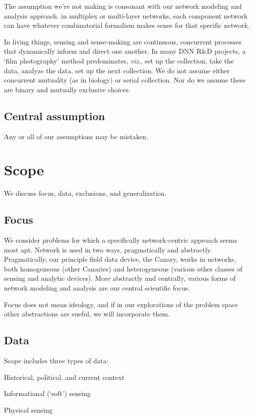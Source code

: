 \documentclass{article} %
\begin{document}
The assumption we're not making is consonant with our network modeling and analysis approach. in multiplex or multi-layer networks, each component network can have whatever combinatorial formalism makes sense for that specific network. 

In living things, sensing and sense-making are continuous, concurrent processes that dynamically inform and direct one another. In many DNN R\&D projects, a `film photography' method predominates, \textit{viz}., set up the collection, take the data, analyze the data, set up the next collection. We do not assume either concurrent mutuality (as in biology) or serial collection. Nor do we assume these are binary and mutually exclusive choices.

\subsection{Central assumption}
Any or all of our assumptions may be mistaken.


\pagebreak\section{Scope}
We discuss focus, data, exclusions, and generalization.

\subsection{Focus}
We consider problems for which a specifically network-centric approach seems most apt. Network is used in two ways, pragmatically and abstractly. Pragmatically, our principle field data device, the Canary, works in networks, both homogeneous (other Canaries) and heterogeneous (various other classes of sensing and analytic devices). More abstractly and centrally, various forms of network modeling and analysis are our central scientific focus. 

Focus does not mean ideology, and if in our explorations of the problem space other abstractions are sueful, we will incorporate them.

\subsection{Data}
Scope includes three types of data:
\begin{itemize*}
\item Historical, political, and current context
\item Informational (`soft') sensing
\item Physical sensing
\end{itemize*}
\end{document}

